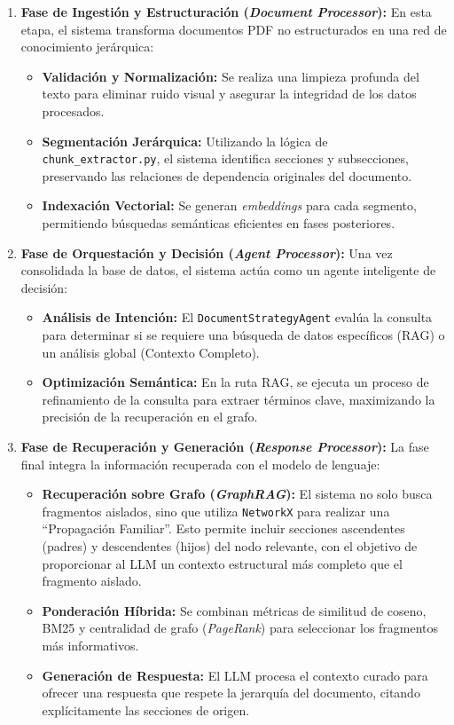 \begin{enumerate}
    \item \textbf{Fase de Ingestión y Estructuración (\textit{Document Processor}):}
    En esta etapa, el sistema transforma documentos PDF no estructurados en una red de conocimiento jerárquica:
    \begin{itemize}
        \item \textbf{Validación y Normalización:} Se realiza una limpieza profunda del texto para eliminar ruido visual y asegurar la integridad de los datos procesados.
        \item \textbf{Segmentación Jerárquica:} Utilizando la lógica de \texttt{chunk\_extractor.py}, el sistema identifica secciones y subsecciones, preservando las relaciones de dependencia originales del documento.
        \item \textbf{Indexación Vectorial:} Se generan \textit{embeddings} para cada segmento, permitiendo búsquedas semánticas eficientes en fases posteriores.
    \end{itemize}

    \item \textbf{Fase de Orquestación y Decisión (\textit{Agent Processor}):}
    Una vez consolidada la base de datos, el sistema actúa como un agente inteligente de decisión:
    \begin{itemize}
        \item \textbf{Análisis de Intención:} El \texttt{DocumentStrategyAgent} evalúa la consulta para determinar si se requiere una búsqueda de datos específicos (RAG) o un análisis global (Contexto Completo).
        \item \textbf{Optimización Semántica:} En la ruta RAG, se ejecuta un proceso de refinamiento de la consulta para extraer términos clave, maximizando la precisión de la recuperación en el grafo.
    \end{itemize}

    \item \textbf{Fase de Recuperación y Generación (\textit{Response Processor}):}
    La fase final integra la información recuperada con el modelo de lenguaje:
    \begin{itemize}
        \item \textbf{Recuperación sobre Grafo (\textit{GraphRAG}):} El sistema no solo busca fragmentos aislados, sino que utiliza \texttt{NetworkX} para realizar una ``Propagación Familiar''. Esto permite incluir secciones ascendentes (padres) y descendentes (hijos) del nodo relevante, con el objetivo de proporcionar al LLM un contexto estructural más completo que el fragmento aislado.
        \item \textbf{Ponderación Híbrida:} Se combinan métricas de similitud de coseno, BM25 y centralidad de grafo (\textit{PageRank}) para seleccionar los fragmentos más informativos.
        \item \textbf{Generación de Respuesta:} El LLM procesa el contexto curado para ofrecer una respuesta que respete la jerarquía del documento, citando explícitamente las secciones de origen.
    \end{itemize}
\end{enumerate}

